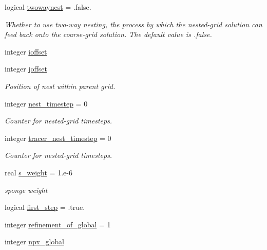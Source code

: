\begin{DoxyCompactItemize}
logical \hyperlink{structfv__arrays__mod_1_1fv__nest__type_a234513f19d64ac85cc358d3772d56a76}{twowaynest} = .false.
\begin{DoxyCompactList}\small\item\em Whether to use two-\/way nesting, the process by which the nested-\/grid solution can feed back onto the coarse-\/grid solution. The default value is .false. \end{DoxyCompactList}\item 
integer \hyperlink{structfv__arrays__mod_1_1fv__nest__type_a8de72175222aeea5f0b915b2ca1c0083}{ioffset}
\item 
integer \hyperlink{structfv__arrays__mod_1_1fv__nest__type_a0947c02b782d243a3ba7c1ba990d2995}{joffset}
\begin{DoxyCompactList}\small\item\em Position of nest within parent grid. \end{DoxyCompactList}\item 
integer \hyperlink{structfv__arrays__mod_1_1fv__nest__type_ac784733ccc09f7037078b71074727228}{nest\-\_\-timestep} = 0
\begin{DoxyCompactList}\small\item\em Counter for nested-\/grid timesteps. \end{DoxyCompactList}\item 
integer \hyperlink{structfv__arrays__mod_1_1fv__nest__type_a0a40f5b9b3c88f219c15c4f5cf45d035}{tracer\-\_\-nest\-\_\-timestep} = 0
\begin{DoxyCompactList}\small\item\em Counter for nested-\/grid timesteps. \end{DoxyCompactList}\item 
real \hyperlink{structfv__arrays__mod_1_1fv__nest__type_a70ba47b82bcf4969d6c200a553c1267a}{s\-\_\-weight} = 1.e-\/6
\begin{DoxyCompactList}\small\item\em sponge weight \end{DoxyCompactList}\item 
logical \hyperlink{structfv__arrays__mod_1_1fv__nest__type_a751315043662ab03c036c2e8f35ed3e3}{first\-\_\-step} = .true.
\item 
integer \hyperlink{structfv__arrays__mod_1_1fv__nest__type_ab6d053aade4a0057cd873c1c1fcd33fa}{refinement\-\_\-of\-\_\-global} = 1
\item 
integer \hyperlink{structfv__arrays__mod_1_1fv__nest__type_a9bb2f8c472e0b576582539e118ef44dd}{npx\-\_\-global}

\end{DoxyCompactItemize}
